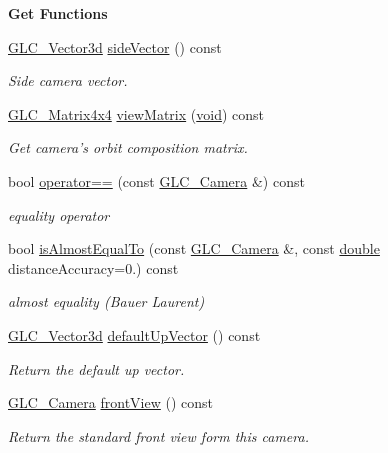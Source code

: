 \begin{Indent}{\bf Get Functions}
\begin{DoxyCompactItemize}
\hyperlink{class_g_l_c___vector3d}{G\-L\-C\-\_\-\-Vector3d} \hyperlink{class_g_l_c___camera_a0d7177e52087d3f991cde23c9fac8fa5}{side\-Vector} () const 
\begin{DoxyCompactList}\small\item\em Side camera vector. \end{DoxyCompactList}\item 
\hyperlink{class_g_l_c___matrix4x4}{G\-L\-C\-\_\-\-Matrix4x4} \hyperlink{class_g_l_c___camera_abc7c3373ebea4741bee55f843dc43201}{view\-Matrix} (\hyperlink{group___u_a_v_objects_plugin_ga444cf2ff3f0ecbe028adce838d373f5c}{void}) const 
\begin{DoxyCompactList}\small\item\em Get camera's orbit composition matrix. \end{DoxyCompactList}\item 
bool \hyperlink{class_g_l_c___camera_a989ac169619dd479d1193a261dcc2eac}{operator==} (const \hyperlink{class_g_l_c___camera}{G\-L\-C\-\_\-\-Camera} \&) const 
\begin{DoxyCompactList}\small\item\em equality operator \end{DoxyCompactList}\item 
bool \hyperlink{class_g_l_c___camera_a9a2efb62c9538aee259baa6aa994f09c}{is\-Almost\-Equal\-To} (const \hyperlink{class_g_l_c___camera}{G\-L\-C\-\_\-\-Camera} \&, const \hyperlink{_super_l_u_support_8h_a8956b2b9f49bf918deed98379d159ca7}{double} distance\-Accuracy=0.) const 
\begin{DoxyCompactList}\small\item\em almost equality (Bauer Laurent) \end{DoxyCompactList}\item 
\hyperlink{class_g_l_c___vector3d}{G\-L\-C\-\_\-\-Vector3d} \hyperlink{class_g_l_c___camera_ac1afed0de570ce21586e5ad947bae985}{default\-Up\-Vector} () const 
\begin{DoxyCompactList}\small\item\em Return the default up vector. \end{DoxyCompactList}\item 
\hyperlink{class_g_l_c___camera}{G\-L\-C\-\_\-\-Camera} \hyperlink{class_g_l_c___camera_aa6388508d09cf09bb03a9a81b9a820a2}{front\-View} () const 
\begin{DoxyCompactList}\small\item\em Return the standard front view form this camera. \end{DoxyCompactList}\item 

\end{DoxyCompactItemize}
\end{Indent}
